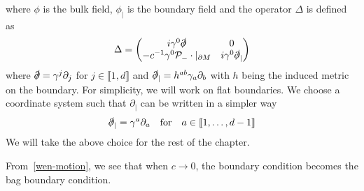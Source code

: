 where $\phi$ is the bulk field, $\phi_|$ is the boundary field and the operator $\Delta$ is defined as
\begin{equation}\label{wen-hamiltonian}
\Delta = \begin{pmatrix}
i \gamma^0 \slashed{\partial}  & 0 \\
-c^{-1} \gamma^0 \mathcal{P}_- \cdot \vert_{\partial M}&  i\gamma^0 \slashed{\partial}_|
\end{pmatrix}
\end{equation}
where $\slashed{\partial} = \gamma^j\partial_j$ for
$j \in \llbracket 1 , d \rrbracket$ and $\slashed{\partial}_| = h^{ab} \gamma_{a} \partial_{b}$ with $h$ being the induced metric on the boundary.
For simplicity, we will work on flat boundaries.
We choose a coordinate system such that 
$\partial_|$ can be written in a simpler way
\begin{equation*}
\slashed \partial_| = \gamma^a\partial_a \quad\mathrm{for}\quad 
a \in \llbracket 1, \ldots, d-1 \rrbracket
\end{equation*}
We will take the above choice for the rest of the chapter. 
\begin{remark}
From~\cref{wen-motion}, we see that when $c \rightarrow 0$, the boundary condition becomes the bag boundary condition. 
\end{remark}




